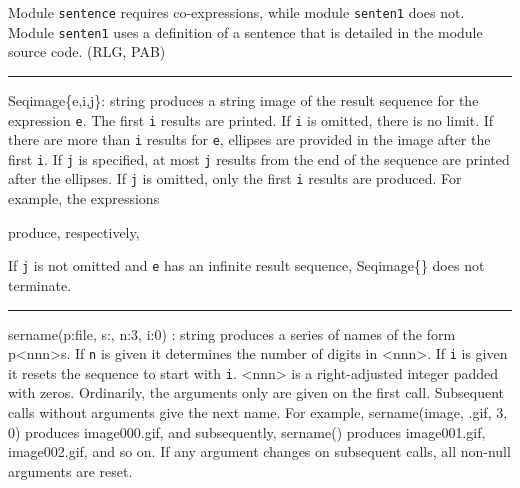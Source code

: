 Module \texttt{sentence} requires co-expressions, while module
\texttt{senten1} does not. Module \texttt{senten1} uses a definition of
a {\textquotedbl}sentence{\textquotedbl} that is detailed in the module
source code. (RLG, PAB)

\vspace{0.25cm}\hrule{}

\textsf{Seqimage\{e,i,j\}: string} produces a string image of the result
sequence for the expression \texttt{e}.  The first \texttt{i}
results are printed. If \texttt{i} is omitted, there is no limit. If
there are more than \texttt{i} results for \texttt{e}, ellipses are
provided in the image after the first \texttt{i}. If \texttt{j} is
specified, at most \texttt{j} results from the end of the sequence are
printed after the ellipses. If \texttt{j} is omitted, only the first
\texttt{i} results are produced. For example, the expressions 


produce, respectively, 


If \texttt{j} is not omitted and \texttt{e} has an infinite result
sequence, \textsf{Seqimage\{\}} does not terminate.

\vspace{0.25cm}\hrule{}

\textsf{sername(p:{\textquotedbl}file{\textquotedbl},
s:{\textquotedbl}{\textquotedbl}, n:3, i:0) : string} produces a series
of names of the form p{\textless}nnn{\textgreater}s. If \texttt{n} is
given it determines the number of digits in
{\textless}nnn{\textgreater}. If \texttt{i} is given it resets the
sequence to start with \texttt{i}. {\textless}nnn{\textgreater} is a
right-adjusted integer padded with zeros. Ordinarily, the arguments
only are given on the first call. Subsequent calls without arguments
give the next name. For example,
\textsf{sername({\textquotedbl}image{\textquotedbl},
{\textquotedbl}.gif{\textquotedbl}, 3, 0)} produces
\textsf{{\textquotedbl}image000.gif{\textquotedbl}}, and subsequently,
\textsf{sername()} produces
\textsf{{\textquotedbl}image001.gif{\textquotedbl}},
\textsf{{\textquotedbl}image002.gif{\textquotedbl}}, and so on. If any
argument changes on subsequent calls, all non-null arguments are reset.



